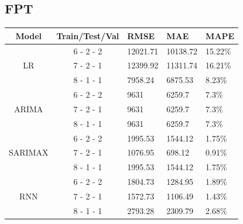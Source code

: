 \documentclass{ieeeojies}
\begin{document}
\subsection{FPT}
\begin{table}[H]
    \renewcommand{\arraystretch}{1.5}
    \centering
    \begin{tabular}{|c|c|p{1cm}|p{1cm}|p{1cm}|}
        \hline
        \textbf{Model} & \textbf{Train/Test/Val} & \textbf{RMSE} & \textbf{MAE} & \textbf{MAPE} \\
        \hline
        \multirow{3}{*}{LR}
                       & 6 - 2 - 2               & 12021.71      & 10138.72     & 15.22\%       \\
        \cline{2-5}
                       & 7 - 2 - 1               & 12399.92      & 11311.74     & 16.21\%       \\
        \cline{2-5}
                       & 8 - 1 - 1               & 7958.24       & 6875.53      & 8.23\%        \\
        \hline
        \multirow{3}{*}{ARIMA}
                       & 6 - 2 - 2               & 9631          & 6259.7       & 7.3\%         \\
        \cline{2-5}
                       & 7 - 2 - 1               & 9631          & 6259.7       & 7.3\%         \\
        \cline{2-5}
                       & 8 - 1 - 1               & 9631          & 6259.7       & 7.3\%         \\
        \hline
        \multirow{3}{*}{SARIMAX}
                       & 6 - 2 - 2               & 1995.53       & 1544.12      & 1.75\%        \\
        \cline{2-5}
                       & 7 - 2 - 1               & 1076.95       & 698.12       & 0.91\%        \\
        \cline{2-5}
                       & 8 - 1 - 1               & 1995.53       & 1544.12      & 1.75\%        \\
        \hline
        \multirow{3}{*}{RNN}
                       & 6 - 2 - 2               & 1804.73       & 1284.95      & 1.89\%        \\
        \cline{2-5}
                       & 7 - 2 - 1               & 1572.73       & 1106.49      & 1.43\%        \\
        \cline{2-5}
                       & 8 - 1 - 1               & 2793.28       & 2309.79      & 2.68\%        \\

\end{tabular}
\end{table}
\end{document}
